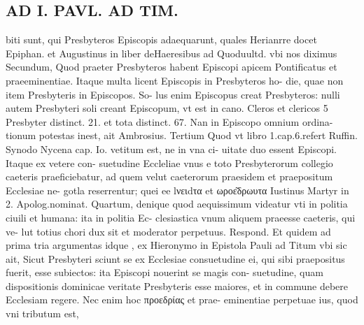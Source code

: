 \documentclass{article}
\begin{document}
\begin{pages}
\section*{AD I. PAVL. AD TIM. }
\marginpar{[ p.96 ]}\pstart biti sunt, qui Presbyteros Episcopis adaequarunt, quales Herianrre docet Epiphan. et Augustinus in liber  deHaeresibus  ad Quoduultd. vbi nos diximus  \pend\pstart Secundum, Quod praeter Presbyteros habent Episcopi apicem Pontificatus et praeeminentiae. Itaque multa licent Episcopis in Presbyteros ho- die, quae non item Presbyteris in Episcopos. So- lus enim Episcopus creat Presbyteros: nulli autem Presbyteri soli creant Episcopum, vt est in cano. Cleros et clericos 5 Presbyter distinct. 21. et tota distinct. 67. Nan in Episcopo omnium ordina- tionum potestas inest, ait Ambrosius.  \pend\pstart Tertium Quod vt libro 1.cap.6.refert Ruffin. Synodo Nycena cap. Io. vetitum est, ne in vna ci- uitate duo essent Episcopi. Itaque ex vetere con- suetudine Eccleliae vnus e toto Presbyterorum collegio caeteris praeficiebatur, ad quem velut caeterorum praesidem et praepositum Ecclesiae ne- gotla reserrentur; quei ee lνειdτα et ωροε͂δρωυτα Iustinus Martyr in 2. Apolog.nominat.  \pend\pstart Quartum, denique quod aequissimum videatur vti in politia ciuili et humana: ita in politia Ec- clesiastica vnum aliquem praeesse caeteris, qui ve- lut totius chori dux sit et moderator perpetuus.  \pend\pstart Respond. Et quidem ad prima tria argumentas idque , ex Hieronymo in Epistola Pauli ad Titum vbi sic ait, Sicut Presbyteri sciunt se ex Ecclesiae consuetudine ei, qui sibi praepositus fuerit, esse subiectos: ita Episcopi nouerint se magis con- suetudine, quam dispositionis dominicae veritate Presbyteris esse maiores, et in commune debere Ecclesiam regere. Nec enim hoc προεδρίας et prae- eminentiae perpetuae ius, quod vni tributum est,  \pend

\end{pages}
\end{document}
